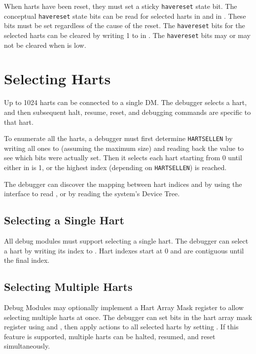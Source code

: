 When harts have been reset, they must set a sticky {\tt havereset} state bit.
The conceptual {\tt havereset} state bits can be read for selected harts in
\Fanyhavereset and \Fallhavereset in \Rdmstatus.
These bits must be set regardless of the cause of the reset.
The {\tt havereset} bits for the selected harts
can be cleared by writing 1 to \Fackhavereset in \Rdmcontrol.
The {\tt havereset} bits may or may not be cleared 
when \Fdmactive is low.

\section{Selecting Harts} \label{selectingharts}

Up to 1024 harts can be connected to a single DM. The debugger
selects a hart, and then subsequent halt, resume, reset, and debugging
commands are specific to that hart.

To enumerate all the harts, a debugger must first determine {\tt HARTSELLEN}
by writing  all ones to \Fhartsel (assuming the maximum size) and reading back
the value to see which bits were actually set.  Then it selects each hart
starting from 0 until either \Fanynonexistent in \Rdmstatus is 1, or the
highest index (depending on {\tt HARTSELLEN}) is reached.

The debugger can discover the mapping between hart indices and
\Rmhartid by using the interface to read \Rmhartid, or by
reading the system's Device Tree.

\subsection {Selecting a Single Hart}

All debug modules must support selecting a single hart.
The debugger can select a hart by writing its index to \Fhartsel.
Hart indexes start at 0 and are contiguous until the final index.

\subsection {Selecting Multiple Harts}

Debug Modules may optionally implement a Hart Array Mask register to allow
selecting multiple harts at once. The debugger can set bits in the hart array mask register
using \Rhawindowsel and \Rhawindow, then apply actions to all selected harts
by setting \Fhasel. If this feature is supported, multiple harts can be
halted, resumed, and reset simultaneously.

